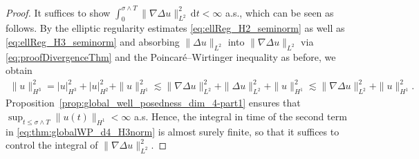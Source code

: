 \documentclass[reqno]{amsart}
\newcommand{\1}{\mathbf{1}}
\newcommand{\grad}{\nabla}
\newcommand{\dt}{\,\mathrm{d}t}
\begin{document}
\begin{proof}
It suffices to show $\int_0^{\sigma\wedge T} \|\grad \Delta u\|^2_{L^2} \dt <\infty$ a.s., which can be seen as follows. By the elliptic regularity estimates \eqref{eq:ellReg_H2_seminorm} as well as \eqref{eq:ellReg_H3_seminorm} and absorbing $\|\Delta u\|_{L^2}$ into $\|\grad\Delta u\|_{L^2}$ via \eqref{eq:proofDivergenceThm} and the Poincaré--Wirtinger inequality as before, we obtain
\begin{align}\label{eq:thm:globalWP_d4_H3norm}
    \|u\|_{H^3}^2 = |u|_{H^3}^2+|u|_{H^2}^2 +\|u\|_{H^1}^2
    \lesssim \|\grad\Delta u\|_{L^2}^2+\|\Delta u\|_{L^2}^2+\|u\|_{H^1}^2 \lesssim \|\grad\Delta u\|_{L^2}^2+\|u\|_{H^1}^2.
\end{align} 
Proposition~\ref{prop:global_well_posedness_dim_4-part1} ensures that $\sup_{t\le \sigma \land T} \|u(t)\|_{H^1}<\infty$ a.s. Hence, the integral in time of the second 
term in \eqref{eq:thm:globalWP_d4_H3norm} 
is almost surely finite, so that it suffices to control the integral of $\|\grad\Delta u\|_{L^2}^2$. 


\end{proof}
\end{document}
